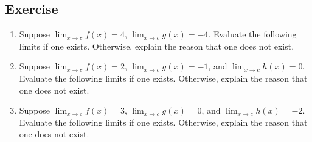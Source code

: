 \documentclass[11pt]{book}
\begin{document}
\subsection*{Exercise}

\begin{enumerate}[label=\arabic*.]
    \item Suppose $\displaystyle\lim_{x\to c}f(x)=4$, $\displaystyle\lim_{x\to c}g(x)=-4$. Evaluate the following limits if one exists. Otherwise, explain the reason that one does not exist.
    \begin{enumerate}
    \end{enumerate}
    \item Suppose $\displaystyle\lim_{x\to c}f(x)=2$, $\displaystyle\lim_{x\to c}g(x)=-1$, and $\displaystyle\lim_{x\to c}h(x)=0$. Evaluate the following limits if one exists. Otherwise, explain the reason that one does not exist.
    \begin{enumerate}
    \end{enumerate}
    \item Suppose $\displaystyle\lim_{x\to c}f(x)=3$, $\displaystyle\lim_{x\to c}g(x)=0$, and $\displaystyle\lim_{x\to c}h(x)=-2$. Evaluate the following limits if one exists. Otherwise, explain the reason that one does not exist.

\end{enumerate}
\end{document}
